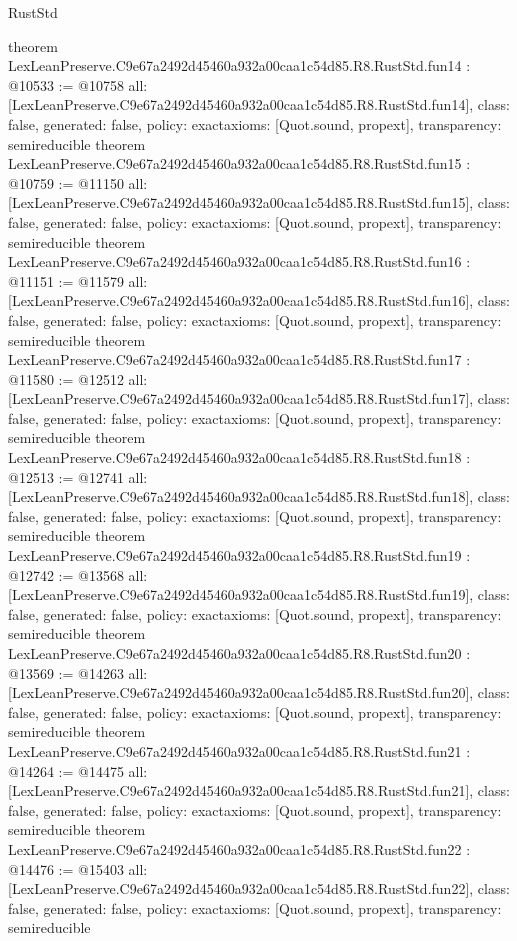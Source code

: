 \begin{lexlean}{RustStd}
\begin{coremodule}
{}
theorem LexLeanPreserve.C9e67a2492d45460a932a00caa1c54d85.R8.RustStd.fun14 : @10533 := @10758 {
  all: [LexLeanPreserve.C9e67a2492d45460a932a00caa1c54d85.R8.RustStd.fun14],
  class: false,
  generated: false,
  policy: exact{axioms: [Quot.sound, propext]},
  transparency: semireducible
}
theorem LexLeanPreserve.C9e67a2492d45460a932a00caa1c54d85.R8.RustStd.fun15 : @10759 := @11150 {
  all: [LexLeanPreserve.C9e67a2492d45460a932a00caa1c54d85.R8.RustStd.fun15],
  class: false,
  generated: false,
  policy: exact{axioms: [Quot.sound, propext]},
  transparency: semireducible
}
theorem LexLeanPreserve.C9e67a2492d45460a932a00caa1c54d85.R8.RustStd.fun16 : @11151 := @11579 {
  all: [LexLeanPreserve.C9e67a2492d45460a932a00caa1c54d85.R8.RustStd.fun16],
  class: false,
  generated: false,
  policy: exact{axioms: [Quot.sound, propext]},
  transparency: semireducible
}
theorem LexLeanPreserve.C9e67a2492d45460a932a00caa1c54d85.R8.RustStd.fun17 : @11580 := @12512 {
  all: [LexLeanPreserve.C9e67a2492d45460a932a00caa1c54d85.R8.RustStd.fun17],
  class: false,
  generated: false,
  policy: exact{axioms: [Quot.sound, propext]},
  transparency: semireducible
}
theorem LexLeanPreserve.C9e67a2492d45460a932a00caa1c54d85.R8.RustStd.fun18 : @12513 := @12741 {
  all: [LexLeanPreserve.C9e67a2492d45460a932a00caa1c54d85.R8.RustStd.fun18],
  class: false,
  generated: false,
  policy: exact{axioms: [Quot.sound, propext]},
  transparency: semireducible
}
theorem LexLeanPreserve.C9e67a2492d45460a932a00caa1c54d85.R8.RustStd.fun19 : @12742 := @13568 {
  all: [LexLeanPreserve.C9e67a2492d45460a932a00caa1c54d85.R8.RustStd.fun19],
  class: false,
  generated: false,
  policy: exact{axioms: [Quot.sound, propext]},
  transparency: semireducible
}
theorem LexLeanPreserve.C9e67a2492d45460a932a00caa1c54d85.R8.RustStd.fun20 : @13569 := @14263 {
  all: [LexLeanPreserve.C9e67a2492d45460a932a00caa1c54d85.R8.RustStd.fun20],
  class: false,
  generated: false,
  policy: exact{axioms: [Quot.sound, propext]},
  transparency: semireducible
}
theorem LexLeanPreserve.C9e67a2492d45460a932a00caa1c54d85.R8.RustStd.fun21 : @14264 := @14475 {
  all: [LexLeanPreserve.C9e67a2492d45460a932a00caa1c54d85.R8.RustStd.fun21],
  class: false,
  generated: false,
  policy: exact{axioms: [Quot.sound, propext]},
  transparency: semireducible
}
theorem LexLeanPreserve.C9e67a2492d45460a932a00caa1c54d85.R8.RustStd.fun22 : @14476 := @15403 {
  all: [LexLeanPreserve.C9e67a2492d45460a932a00caa1c54d85.R8.RustStd.fun22],
  class: false,
  generated: false,
  policy: exact{axioms: [Quot.sound, propext]},
  transparency: semireducible
}
\end{coremodule}
\end{lexlean}
